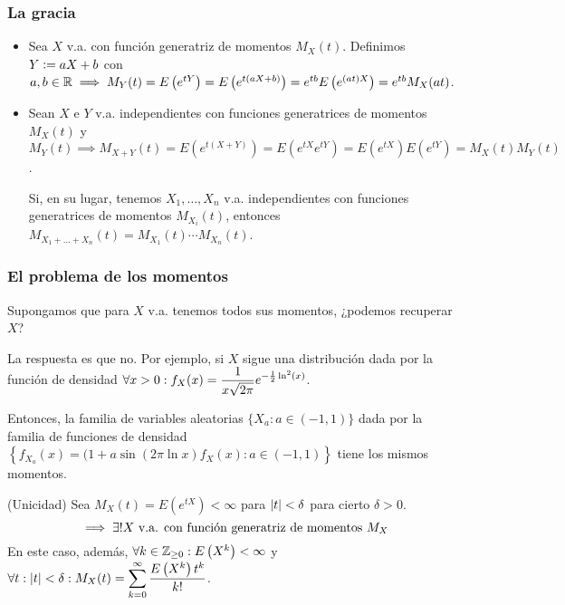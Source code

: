 \subsubsection{La gracia}

\begin{itemize}
	\item Sea $X$ v.a. con función generatriz de momentos $M_X(t)$. Definimos $Y\vcentcolon= aX+b$ con $a,b\in \mathbb{R} \implies M_Y(t) = E\left(e^{tY}\right) = E\left(e^{t(aX+b)}\right) = e^{tb}E\left(e^{(at)X}\right) = e^{tb}M_X(at)$.

	\item Sean $X$ e $Y$ v.a. independientes con funciones generatrices de momentos $M_X(t)$ y $M_Y(t) \implies M_{X+Y}(t) = E\left(e^{t(X+Y)}\right) = E\left(e^{tX}e^{tY}\right) = E\left(e^{tX}\right)E\left(e^{tY}\right) = M_X(t)M_Y(t)$.

	      Si, en su lugar, tenemos $X_1, \dots, X_n$ v.a. independientes con funciones generatrices de momentos $M_{X_i}(t)$, entonces $M_{X_1 + \dots + X_n}(t) = M_{X_1}(t) \cdots M_{X_n}(t)$.
\end{itemize}

\subsubsection{El problema de los momentos}

Supongamos que para $X$ v.a. tenemos todos sus momentos, ¿podemos recuperar $X$?

La respuesta es que no. Por ejemplo, si $X$ sigue una distribución dada por la función de densidad $\displaystyle \forall x > 0 : f_X(x) = \frac{1}{x\sqrt{2\pi}} e^{-\frac{1}{2}\ln^2(x)}$.

Entonces, la familia de variables aleatorias $\{X_a : a \in (-1, 1)\}$ dada por la familia de funciones de densidad $\left\{f_{X_a}(x) = (1+a\sin{(2\pi \ln{x}) f_X(x)} : a \in (-1, 1)\right\}$ tiene los mismos momentos. %

\begin{teo}(Unicidad)
	Sea $M_X(t) = E\left(e^{tX}\right) < \infty$ para $\left|t\right| < \delta$ para cierto $\delta > 0$.
	\[\implies \exists ! X \text{ v.a. con función generatriz de momentos }M_X\]
	En este caso, además, $\forall k \in \mathbb{Z}_{\geq 0} : E\left(X^k\right) < \infty$ y $\displaystyle \forall t : \left|t\right| < \delta : M_X(t) = \sum_{k=0}^{\infty} \frac{E\left(X^k\right)t^k}{k!}$.
\end{teo}

